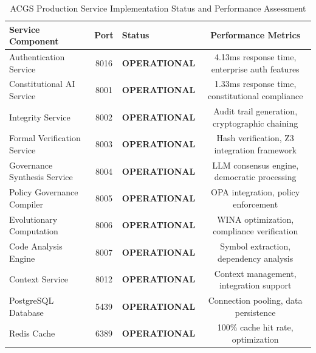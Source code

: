 \documentclass[manuscript,screen,9pt]{acmart}
\newcommand{\tablesize}{\footnotesize}
\newcommand{\tableheader}[1]{\textbf{#1}}
\begin{document}
\begin{table}[!htb]
	\centering
	\caption{ACGS Production Service Implementation Status and Performance Assessment}
	\label{tab:implementation_status}
	\tablesize
	\begin{tabular}{@{}lclc@{}}
		\toprule
		\tableheader{Service Component} & \tableheader{Port} & \tableheader{Status} & \tableheader{Performance Metrics}               \\
		\midrule
		Authentication Service          & 8016               & \textbf{OPERATIONAL} & 4.13ms response time, enterprise auth features  \\
		Constitutional AI Service       & 8001               & \textbf{OPERATIONAL} & 1.33ms response time, constitutional compliance \\
		Integrity Service               & 8002               & \textbf{OPERATIONAL} & Audit trail generation, cryptographic chaining  \\
		Formal Verification Service     & 8003               & \textbf{OPERATIONAL} & Hash verification, Z3 integration framework     \\
		Governance Synthesis Service    & 8004               & \textbf{OPERATIONAL} & LLM consensus engine, democratic processing     \\
		Policy Governance Compiler      & 8005               & \textbf{OPERATIONAL} & OPA integration, policy enforcement             \\
		Evolutionary Computation        & 8006               & \textbf{OPERATIONAL} & WINA optimization, compliance verification      \\
		Code Analysis Engine            & 8007               & \textbf{OPERATIONAL} & Symbol extraction, dependency analysis          \\
		Context Service                 & 8012               & \textbf{OPERATIONAL} & Context management, integration support         \\
		\midrule
		PostgreSQL Database             & 5439               & \textbf{OPERATIONAL} & Connection pooling, data persistence            \\
		Redis Cache                     & 6389               & \textbf{OPERATIONAL} & 100\% cache hit rate, optimization              \\
		\bottomrule
	\end{tabular}
\end{table}
\end{document}

